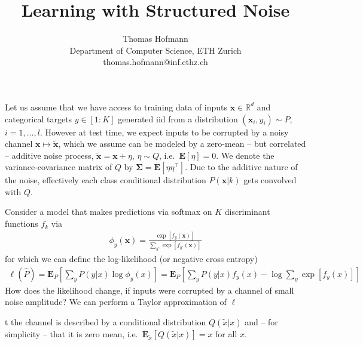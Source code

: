 \documentclass{article}
\title{
	Learning with Structured Noise
}
\author{
	Thomas Hofmann \\[1mm] Department of Computer Science, ETH Zurich \\ thomas.hofmann@inf.ethz.ch
}
\newcommand{\x}{{\mathbf x}}
\newcommand{\mSigma}{{\boldsymbol \Sigma}}
\renewcommand{\Re}{{\mathbb R}}
\newcommand{\E}{{\mathbf E}}
\begin{document}
\maketitle 

Let us assume that we have access to training data of inputs $\x \in \Re^d$ and categorical targets $y \in [1\!:\!K]$ generated iid from a distribution $(\x_i,y_i) \sim P$, $i=1,\dots,l$.  However at test time, we expect inputs to be corrupted by a noisy channel $\x \mapsto \tilde \x$, which we assume can be modeled by a zero-mean -- but correlated -- additive  noise process, $\tilde \x = \x + \eta$, $\eta \sim Q$, i.e.~$\E[\eta]=0$. We denote the variance-covariance matrix of $Q$ by $\mSigma = \E[ \eta \eta^\top]$. Due to the additive nature of the noise, effectively each class conditional distribution $P(\x|k)$ gets convolved with $Q$.  

Consider a model that makes predictions via softmax on $K$ discriminant functions $f_k$ via 
\begin{align}
\phi_y(\x) = \frac{\exp[ f_y(\x)]}{\sum_{y'} \exp[ f_{y'}(\x)]}
\end{align}
for which we can define the log-likelihood (or negative cross entropy)
\begin{align}
\ell(\hat P) 
= \E_P\left[ \sum_y P(y|x) \log \phi_y(x) \right] 
= \E_P\left[ \sum_y P(y|x) f_y(x)  - \log \sum_{y} \exp[f_y(x)] \right]
\end{align}
How does the likelihood change, if inputs were corrupted by a channel of small noise amplitude? We can perform a Taylor approximation of $\ell$ 


\newpage
t
the channel is described by a conditional distribution $Q(\tilde x|x)$ and -- for simplicity -- that it is zero mean, i.e.~$\E_{\tilde x}\left[ Q(\tilde x|x)\right]=x$ for all $x$.  



\end{document}

